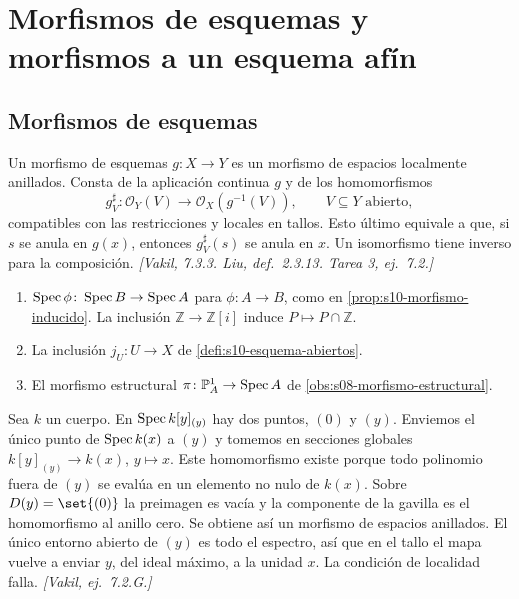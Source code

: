 \section{Morfismos de esquemas y morfismos a un esquema afín}
\label{sec:s10-morfismos}

\subsection{Morfismos de esquemas}

\begin{defi}
\label{defi:s10-morfismo-esquemas}
Un morfismo de esquemas \(g\colon X\to Y\) es un morfismo de espacios localmente anillados. Consta de la aplicación continua \(g\) y de los homomorfismos
\[
 g_V^\sharp\colon\mathcal O_Y(V)\longrightarrow\mathcal O_X(g^{-1}(V)),
 \qquad V\subseteq Y\text{ abierto},
\]
compatibles con las restricciones y locales en tallos. Esto último equivale a que, si \(s\) se anula en \(g(x)\), entonces \(g_V^\sharp(s)\) se anula en \(x\). Un isomorfismo tiene inverso para la composición. \emph{[Vakil, 7.3.3. Liu, def.~2.3.13. Tarea 3, ej.~7.2.]}
\end{defi}

\begin{ejem}
\label{ejem:s10-primeros-morfismos}
\begin{enumerate}[label=(\alph*)]
\item \(\operatorname{Spec}\phi\colon\operatorname{Spec} B\to\operatorname{Spec} A\) para \(\phi\colon A\to B\), como en \cref{prop:s10-morfismo-inducido}. La inclusión \(\mathbb Z\to\mathbb Z[i]\) induce \(P\mapsto P\cap\mathbb Z\).
\item La inclusión \(j_U\colon U\to X\) de \cref{defi:s10-esquema-abiertos}.
\item El morfismo estructural \(\pi\colon\mathbb P^1_A\to\operatorname{Spec} A\) de \cref{obs:s08-morfismo-estructural}.
\end{enumerate}
\end{ejem}

\begin{obs}
\label{obs:s10-localidad-necesaria}
Sea \(k\) un cuerpo. En \(\operatorname{Spec} k[y]_{(y)}\) hay dos puntos, \((0)\) y \((y)\). Enviemos el único punto de \(\operatorname{Spec} k(x)\) a \((y)\) y tomemos en secciones globales \(k[y]_{(y)}\to k(x)\), \(y\mapsto x\). Este homomorfismo existe porque todo polinomio fuera de \((y)\) se evalúa en un elemento no nulo de \(k(x)\). Sobre \(D(y)=\set{(0)}\) la preimagen es vacía y la componente de la gavilla es el homomorfismo al anillo cero. Se obtiene así un morfismo de espacios anillados. El único entorno abierto de \((y)\) es todo el espectro, así que en el tallo el mapa vuelve a enviar \(y\), del ideal máximo, a la unidad \(x\). La condición de localidad falla. \emph{[Vakil, ej.~7.2.G.]}
\end{obs}

